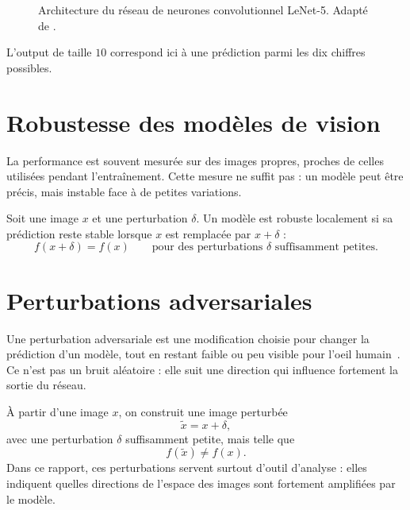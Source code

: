 \begin{figure}[H]
{
    }
    \caption{Architecture du réseau de neurones convolutionnel LeNet-5. Adapté de \cite{lecun1998gradient}.}
    \label{fig:lenet5}
\end{figure}

L'output de taille $10$ correspond ici à une prédiction parmi les dix chiffres possibles.

\section{Robustesse des modèles de vision}

La performance est souvent mesurée sur des images propres, proches de celles utilisées pendant l'entraînement. Cette mesure ne suffit pas : un modèle peut être précis, mais instable face à de petites variations.

Soit une image $x$ et une perturbation $\delta$. Un modèle est robuste localement si sa prédiction reste stable lorsque $x$ est remplacée par $x+\delta$ :
\[
    f(x+\delta) = f(x)
    \qquad \text{pour des perturbations } \delta \text{ suffisamment petites.}
\]

\section{Perturbations adversariales}
\label{sec:perturbation_adversariale}

Une perturbation adversariale est une modification choisie pour changer la prédiction d'un modèle, tout en restant faible ou peu visible pour l'oeil humain~\cite{szegedy2014intriguing}. Ce n'est pas un bruit aléatoire : elle suit une direction qui influence fortement la sortie du réseau.

À partir d'une image $x$, on construit une image perturbée
\[
    \widetilde{x} = x + \delta,
\]
avec une perturbation $\delta$ suffisamment petite, mais telle que
\[
    f(\widetilde{x}) \neq f(x).
\]
Dans ce rapport, ces perturbations servent surtout d'outil d'analyse : elles indiquent quelles directions de l'espace des images sont fortement amplifiées par le modèle.

